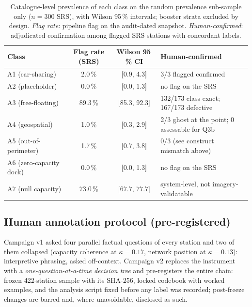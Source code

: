 \documentclass[11pt,a4paper]{article}
\begin{document}
\begin{table}[!htbp]
\centering
\caption{Catalogue-level prevalence of each class on the random
prevalence sub-sample only ($n = 300$ SRS), with Wilson 95\,\% intervals;
booster strata excluded by design. \emph{Flag rate}: pipeline flag on the
audit-dated snapshot. \emph{Human-confirmed}: adjudicated confirmation
among flagged SRS stations with concordant labels.}
\label{tab:prevalence}
\small
\begin{tabular}{@{}lccl@{}}
\toprule
\textbf{Class} & \textbf{Flag rate (SRS)} & \textbf{Wilson 95\,\% CI} &
\textbf{Human-confirmed}\\
\midrule
A1 (car-sharing)        & 2.0\,\%  & [0.9, 4.3]   & 3/3 flagged confirmed \\
A2 (placeholder)        & 0.0\,\%  & [0.0, 1.3]   & no flag on the SRS \\
A3 (free-floating)      & 89.3\,\% & [85.3, 92.3] & 132/173 class-exact; 167/173 defective \\
A4 (geospatial)         & 1.0\,\%  & [0.3, 2.9]   & 2/3 ghost at the point; 0 assessable for Q3b \\
A5 (out-of-perimeter)   & 1.7\,\%  & [0.7, 3.8]   & 0/3 (see construct mismatch above) \\
A6 (zero-capacity dock) & 0.0\,\%  & [0.0, 1.3]   & no flag on the SRS \\
A7 (null capacity)      & 73.0\,\% & [67.7, 77.7] & system-level, not imagery-validatable \\
\bottomrule
\end{tabular}
\end{table}

\subsection{Human annotation protocol (pre-registered)}\label{secAnnotation}
Campaign v1 asked four parallel factual questions of every station and
two of them collapsed (capacity coherence at $\kappa = 0.17$, network
position at $\kappa = 0.13$): interpretive phrasing, asked off-context.
Campaign v2 replaces the instrument with a \emph{one-question-at-a-time
decision tree} and pre-registers the entire chain: frozen 422-station
sample with its SHA-256, locked codebook with worked examples, and the
analysis script fixed before any label was recorded; post-freeze changes
are barred and, where unavoidable, disclosed as such.
\end{document}
